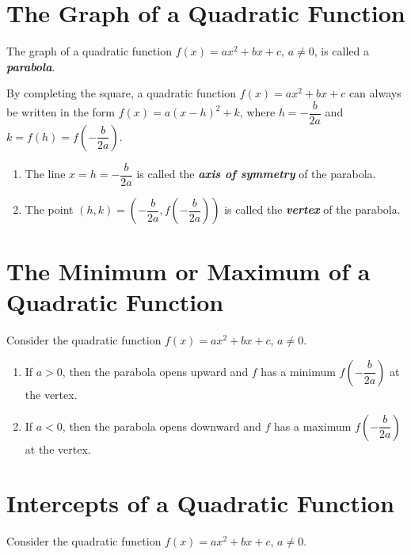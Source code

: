 \documentclass[
  en,11pt]{elegantbook}
\providecommand{\tightlist}{%
  \setlength{\itemsep}{0pt}\setlength{\parskip}{0pt}}
\begin{document}
\hypertarget{the-graph-of-a-quadratic-function}{%
\section{The Graph of a Quadratic Function}\label{the-graph-of-a-quadratic-function}}

The graph of a quadratic function \(f(x)=ax^2+bx+c\), \(a\neq 0\), is called a \textbf{\emph{parabola}}.

By completing the square, a quadratic function \(f(x)=ax^2+bx+c\) can always be written in the form \(f(x)=a(x-h)^2+k\), where \(h=-\dfrac{b}{2a}\) and \(k=f(h)=f\left(-\dfrac{b}{2a}\right)\).

\begin{enumerate}
\def\labelenumi{\arabic{enumi}.}
\tightlist
\item
  The line \(x=h=-\dfrac{b}{2a}\) is called the \textbf{\emph{axis of symmetry}} of the parabola.
\item
  The point \((h, k)=\left(-\dfrac{b}{2a}, f\left(-\dfrac{b}{2a}\right)\right)\) is called the \textbf{\emph{vertex}} of the parabola.
\end{enumerate}

\hypertarget{the-minimum-or-maximum-of-a-quadratic-function}{%
\section{The Minimum or Maximum of a Quadratic Function}\label{the-minimum-or-maximum-of-a-quadratic-function}}

Consider the quadratic function \(f(x)=ax^2+bx+c\), \(a\neq 0\).

\begin{enumerate}
\def\labelenumi{\arabic{enumi}.}
\tightlist
\item
  If \(a>0\), then the parabola opens upward and \(f\) has a minimum \(f\left(-\dfrac{b}{2a}\right)\) at the vertex.
\item
  If \(a<0\), then the parabola opens downward and \(f\) has a maximum \(f\left(-\dfrac{b}{2a}\right)\) at the vertex.
\end{enumerate}

\hypertarget{intercepts-of-a-quadratic-function}{%
\section{Intercepts of a Quadratic Function}\label{intercepts-of-a-quadratic-function}}

Consider the quadratic function \(f(x)=ax^2+bx+c\), \(a\neq 0\).
\end{document}
